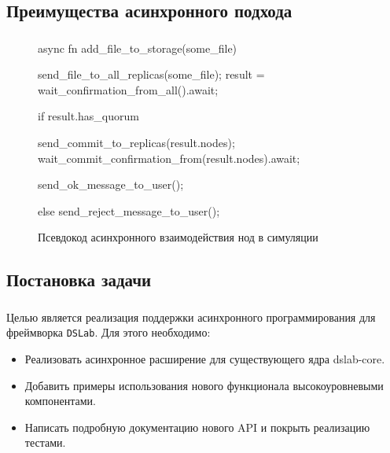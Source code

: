 \documentclass[t]{beamer}  %
\begin{document}
	\subsection{Преимущества асинхронного подхода}
	\begin{frame}[fragile]
		\frametitle{\insertsection} 
		\framesubtitle{\insertsubsection}

		\begin{figure}
			\footnotesize
			\centering
			\begin{rustcode}
async fn add_file_to_storage(some_file) {
  send_file_to_all_replicas(some_file);
  result = wait_confirmation_from_all().await;

  if result.has_quorum {
    send_commit_to_replicas(result.nodes);
    wait_commit_confirmation_from(result.nodes).await;

    send_ok_message_to_user();
  } else {
    send_reject_message_to_user();
  }
}
			\end{rustcode}
			\caption*{Псевдокод асинхронного взаимодействия нод в симуляции}
		\end{figure}


	\end{frame}

	\subsection{Постановка задачи}
	\begin{frame}[fragile]
		\frametitle{\insertsection} 
		\framesubtitle{\insertsubsection}

		
		Целью является реализация поддержки асинхронного программирования для фреймворка \texttt{DSLab}. Для этого необходимо:

		\begin{itemize}
			\item Реализовать асинхронное расширение для существующего ядра dslab-core.
			\item Добавить примеры использования нового функционала высокоуровневыми компонентами.
			\item Написать подробную документацию нового API и покрыть реализацию тестами.
		\end{itemize}


	\end{frame}
\end{document}
